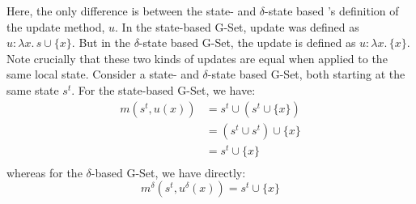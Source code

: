 Here, the only difference is between the state- and $\delta$-state based \CRDT's
definition of the update method, $u$. In the state-based G-Set, update was
defined as $u : \lambda x.\, s \cup \{ x \}$. But in the $\delta$-state based
G-Set, the update is defined as $u : \lambda x.\, \{ x \}$. Note crucially that
these two kinds of updates are equal when applied to the same local state.
Consider a state- and $\delta$-state based G-Set, both starting at the same
state $s^t$. For the state-based G-Set, we have:
\[
  \begin{aligned}
    m(s^t, u(x))
      &= s^t \cup (s^t \cup \{ x \}) \\
      &= (s^t \cup s^t) \cup \{ x \} \\
      &= s^t \cup \{ x \} \\
  \end{aligned}
\]
whereas for the $\delta$-based G-Set, we have directly:
\[
  m^\delta(s^t, u^\delta(x)) = s^t \cup \{ x \}
\]
